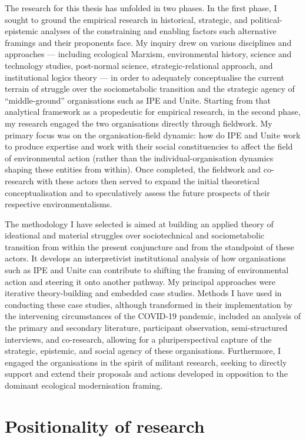 \documentclass[a4paper, nobind]{templates/ociamthesis}
\begin{document}
The research for this thesis has unfolded in two phases. In the first phase, I sought to ground the empirical research in historical, strategic, and political-epistemic analyses of the constraining and enabling factors such alternative framings and their proponents face. My inquiry drew on various disciplines and approaches --- including ecological Marxism, environmental history, science and technology studies, post-normal science, strategic-relational approach, and institutional logics theory --- in order to adequately conceptualise the current terrain of struggle over the sociometabolic transition and the strategic agency of ``middle-ground'' organisations such as IPE and Unite. Starting from that analytical framework as a propedeutic for empirical research, in the second phase, my research engaged the two organisations directly through fieldwork. My primary focus was on the organisation-field dynamic: how do IPE and Unite work to produce expertise and work with their social constituencies to affect the field of environmental action (rather than the individual-organisation dynamics shaping these entities from within). Once completed, the fieldwork and co-research with these actors then served to expand the initial theoretical conceptualisation and to speculatively assess the future prospects of their respective environmentalisms.

The methodology I have selected is aimed at building an applied theory of ideational and material struggles over sociotechnical and sociometabolic transition from within the present conjuncture and from the standpoint of these actors. It develops an interpretivist institutional analysis of how organisations such as IPE and Unite can contribute to shifting the framing of environmental action and steering it onto another pathway. My principal approaches were iterative theory-building and embedded case studies. Methods I have used in conducting these case studies, although transformed in their implementation by the intervening circumstances of the COVID-19 pandemic, included an analysis of the primary and secondary literature, participant observation, semi-structured interviews, and co-research, allowing for a pluriperspectival capture of the strategic, epistemic, and social agency of these organisations. Furthermore, I engaged the organisations in the spirit of militant research, seeking to directly support and extend their proposals and actions developed in opposition to the dominant ecological modernisation framing.

\hypertarget{positionality-of-research}{%
\section{Positionality of research}\label{positionality-of-research}}
\end{document}
